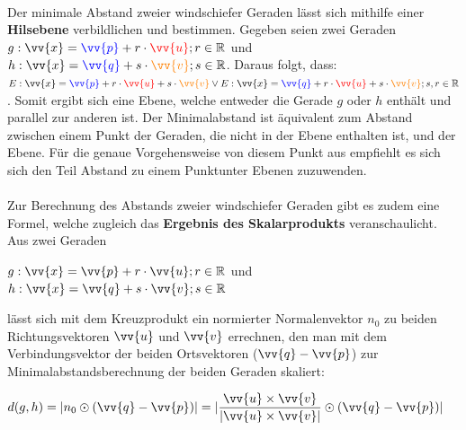             \paragraph{} Der minimale Abstand zweier windschiefer Geraden lässt sich mithilfe einer \textbf{Hilsebene} verbildlichen und bestimmen. Gegeben
            seien zwei Geraden
            $g:\vv{x} = \textcolor{blue}{\vv{p}} + r \cdot \textcolor{red}{\vv{u}}; r\in\R$ und $h:\vv{x} = \textcolor{blue}{\vv{q}} + s \cdot \textcolor{orange}{\vv{v}}; s\in \R$.
            Daraus folgt, dass:
            $E:\vv{x} = \textcolor{blue}{\vv{p}} + r \cdot \textcolor{red}{\vv{u}} + s \cdot \textcolor{orange}{\vv{v}} \lor E:\vv{x} = \textcolor{blue}{\vv{q}} + r \cdot \textcolor{red}{\vv{u}} + s \cdot \textcolor{orange}{\vv{v}}; s,r\in\R$. Somit ergibt sich eine
            Ebene, welche entweder die Gerade $g$ oder $h$ enthält und parallel zur anderen ist. Der Minimalabstand ist äquivalent zum Abstand zwischen
            einem Punkt der Geraden, die nicht in der Ebene enthalten ist, und der Ebene. Für die genaue Vorgehensweise von diesem Punkt aus empfiehlt es
            sich sich den Teil \glqq Abstand zu einem Punkt\grqq \text{ }unter Ebenen zuzuwenden.
        \\
        \begin{Bemerkung}
            \paragraph{} Zur Berechnung des Abstands zweier windschiefer Geraden gibt es zudem eine Formel, welche zugleich das
            \textbf{Ergebnis des Skalarprodukts} veranschaulicht. Aus zwei Geraden
            \begin{center}
                \qquad $g:\vv{x} = \vv{p} + r \cdot \vv{u}; r\in\R$ \qquad und \qquad $h:\vv{x} = \vv{q} + s \cdot \vv{v}; s\in\R$
            \end{center}
            lässt sich mit dem Kreuzprodukt ein normierter Normalenvektor $n_0$ zu beiden Richtungsvektoren $\vv{u}$ und $\vv{v}$ errechnen, den man mit dem
            Verbindungsvektor der beiden Ortsvektoren ($\vv{q}-\vv{p}$) zur Minimalabstandsberechnung der beiden Geraden skaliert:
            \begin{center}
                \qquad $d(g,h)= |n_0 \odot (\vv{q}-\vv{p})| =  |\dfrac{\vv{u} \times \vv{v}}{|\vv{u} \times \vv{v}|} \odot (\vv{q}-\vv{p})|$
            \end{center}
        \end{Bemerkung}



